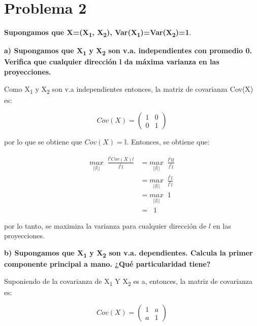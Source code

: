 \section*{Problema 2}

\textbf{Supongamos que X=(X\textsubscript{1}, X\textsubscript{2}), Var(X\textsubscript{1})=Var(X\textsubscript{2})=1}.


\textbf{a) Supongamos que X\textsubscript{1} y X\textsubscript{2} son v.a. independientes con promedio 0. Verifica que cualquier dirección l da máxima varianza en las proyecciones.}

Como X\textsubscript{1} y X\textsubscript{2} son v.a independientes entonces, la matriz de covarianza Cov(X) es:

\begin{equation*}
    Cov(X) = \begin{pmatrix}
        1 & 0 \\
        0 & 1
    \end{pmatrix}
\end{equation*}

por lo que se obtiene que $Cov(X)= \mathbb{I}$. Entonces, se obtiene que:

\begin{align*}
    \underset{||l||}{max} \;\; \frac{l^t Cov(X) l}{l^t l} & = \underset{||l||}{max} \;\; \frac{l^t \mathbb{I} l}{l^t l} \\
                                                          & = \underset{||l||}{max} \;\; \frac{l^t l}{l^t l}            \\
                                                          & = \underset{||l||}{max} \;\; 1                              \\
                                                          & = \;\; 1
\end{align*}

por lo tanto, se maximiza la varianza para cualquier dirección de $l$ en las proyecciones.

\textbf{b) Supongamos que X\textsubscript{1} y X\textsubscript{2} son v.a. dependientes. Calcula la primer componente principal a mano. ¿Qué particularidad tiene?}

Suponiendo de la covarianza de X\textsubscript{1} Y X\textsubscript{2} es a, entonces, la matriz de covarianza es:

\begin{equation*}
    Cov(X) =
    \begin{pmatrix}
        1 & a \\
        a & 1
    \end{pmatrix}
\end{equation*}

